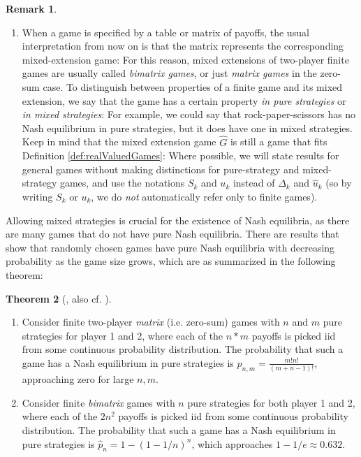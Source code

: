 \documentclass[a4paper]{scrreprt}
\theoremstyle{definition}
\newtheorem{thm}{Theorem}[chapter] %
\newtheorem{rem}[thm]{Remark}
\begin{document}
\begin{rem}
\begin{enumerate}
            \item 
            \label{item:mixedExtensionsRemark-matrixBimatrixGamesRemark}
            When a game is specified by a table or matrix of payoffs, the usual interpretation from now on is that the matrix represents the corresponding mixed-extension game:
            For this reason, mixed extensions of two-player finite
            games are usually called \emph{bimatrix games}, or just \emph{matrix games} in the zero-sum case.
            To distinguish between properties of a finite game and its mixed extension, we say that the game has a certain property \emph{in pure strategies} or \emph{in mixed strategies}:
            For example, we could say that rock-paper-scissors has no Nash equilibrium in pure strategies, but it does have one in mixed strategies.
            Keep in mind that the mixed extension game $\hat{G}$ is still a game that fits Definition \ref{def:realValuedGames}:
            Where possible, we will state results for general games without making distinctions for pure-strategy and mixed-strategy games, and use the notations $S_k$ and $u_k$ instead of $\Delta_k$ and $\hat{u}_k$ (so by writing $S_k$ or $u_k$, we do \emph{not} automatically refer only to finite games).
        \end{enumerate}
    \end{rem}
    Allowing mixed strategies is crucial for the existence of Nash equilibria, as there are many games that do not have pure Nash equilibria. There are results that show that randomly chosen games have pure Nash equilibria with decreasing probability as the game size grows, which are as summarized in the following theorem:
    \begin{thm}[{\cite{bib:goldbergProbabilityOfEquilibria}, also cf. \cites[p.15]{bib:matsumotoGameTheory}[Exercise 1.2]{bib:nisanAlgorithmicGameTheoryCh1Basic}}]~
        \label{thm:probabilityOfPureNashEquilibria}
        \begin{enumerate}
            \item
            Consider finite two-player \emph{matrix} (i.e. zero-sum) games with $n$ and $m$ pure strategies for player 1 and 2, where each of the $n*m$ payoffs is picked iid from some continuous probability distribution.
            The probability that such a game has a Nash equilibrium in pure strategies is $p_{n, m} = \frac{m! n!}{(m+n-1)!}$, approaching zero for large $n, m$.
            
            \item 
            Consider finite \emph{bimatrix} games with $n$ pure strategies for both player 1 and 2, where each of the $2n^2$ payoffs is picked iid from some continuous probability distribution.
            The probability that such a game has a Nash equilibrium in pure strategies is $\hat{p}_{n} = 1 - (1-1/n)^n$, which approaches $1 - 1/e \approx 0.632$.
        \end{enumerate}
    \end{thm}
\end{document}
